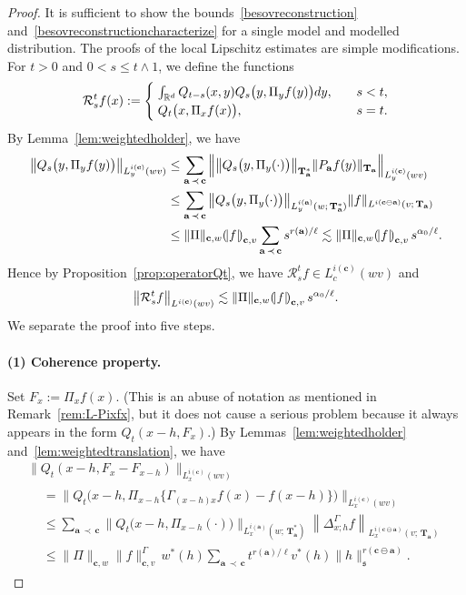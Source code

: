 \documentclass[AHL,Unicode,longabstracts,published]{cedram}
\makeatletter
\newcommand{\bbR}{\mathbb{R}}
\newcommand{\mfs}{\mathfrak{s}}
\newcommand{\wco}{w^*}
\newcommand{\vco}{v^*}
\newcommand{\bfa}{\mathbf{a}}
\newcommand{\bfc}{\mathbf{c}}
\newcommand{\bfcoa}{\mathbf{c}\ominus\mathbf{a}}
\newcommand{\bfT}{\mathbf{T}}
\newcommand{\mcR}{\mathcal{R}}
\newcommand{\llparenthesis}{\mathopen{(\mkern -2.7mu|}}
\newcommand{\rrparenthesis}{\mathclose{|\mkern -2.7mu)}}
\newcommand{\lp}{\llparenthesis}
\newcommand{\rp}{\rrparenthesis}
\newenvironment{alcases}{\left\{\begingroup\arraycolsep=0pt\renewcommand{\arraystretch}{1.2}\begin{array}{r@{\;}l@{\quad}l}}{\end{array}\endgroup\right.}
\makeatother
\begin{document}
\begin{proof}
It is sufficient to show the bounds~\eqref{besovreconstruction} and~\eqref{besovreconstructioncharacterize} for a single model and modelled distribution. The proofs of the local Lipschitz estimates are simple modifications. For $t>0$ and $0<s\le t\wedge1$, we define the functions
\begin{align*}
\mcR_s^t f(x):=
\begin{alcases}
&\int_{\bbR^d}Q_{t-s}(x,y)Q_s\big(y,\Pi_yf(y)\big)dy,\quad&s<t,\\
&Q_t\big(x,\Pi_xf(x)\big),&s=t.
\end{alcases}
\end{align*}
By Lemma~\ref{lem:weightedholder}, we have
\begin{align*}
\big\|Q_s\big(y,\Pi_yf(y)\big)\big\|_{L_y^{i(\bfc)}(wv)} &\le\sum_{\bfa\,\prec \,\bfc}\Big\|\big\|Q_s\big(y,\Pi_y(\cdot)\big)\big\|_{\bfT_\bfa^*}\|P_\bfa f(y)\|_{\bfT_\bfa}\Big\|_{L_y^{i(\bfc)}(wv)}\\
&\le\sum_{\bfa\,\prec \,\bfc}\big\|Q_s\big(y,\Pi_y(\cdot)\big)\big\|_{L_y^{i(\bfa)}(w;\,\bfT_\bfa^*)}\|f\|_{L^{i(\bfcoa)}(v;\,\bfT_\bfa)}\\
&\le \|\Pi\|_{\bfc,w}\lp f\rp_{\bfc,v}\sum_{\bfa\,\prec \,\bfc}s^{r(\bfa)/\ell}
\lesssim\|\Pi\|_{\bfc,w}\lp f\rp_{\bfc,v}\, s^{\alpha_0/\ell}.
\end{align*}
Hence by Proposition~\ref{prop:operatorQt}, we have $\mcR_s^tf\in L_c^{i(\bfc)}(wv)$ and
\[
\left\|\mcR_s^tf\right\|_{L^{i(\bfc)}(wv)}\lesssim\|\Pi\|_{\bfc,w}\lp f\rp_{\bfc,v}\, s^{\alpha_0/\ell}.
\]
We separate the proof into five steps.


\paragraph*{(1) Coherence property.}
Set $F_x:=\Pi_xf(x)$. (This is an abuse of notation as mentioned in Remark~\ref{rem:L-Pixfx}, but it does not cause a serious problem because it always appears in the form $Q_t(x-h,F_x)$.) By Lemmas~\ref{lem:weightedholder} and~\ref{lem:weightedtranslation}, we have
\begin{multline*}
\big\|Q_t(x-h,F_x-F_{x-h})\big\|_{L_x^{i(\bfc)}(wv)}
\\
\begin{aligned}
&=\big\|Q_t\big(x-h,\Pi_{x-h}\big\{\Gamma_{(x-h)x}f(x)-f(x-h)\big\}\big)\big\|_{L_x^{i(\bfc)}(wv)}\\
&\le\sum_{\bfa\,\prec \,\bfc}\big\|Q_t\big(x-h,\Pi_{x-h}(\cdot)\big)\big\|_{L_x^{i(\bfa)}\left(w;\,\bfT_\bfa^*\right)}\left\|\Delta_{x;h}^\Gamma f\right\|_{L_x^{i(\bfcoa)}(v;\,\bfT_\bfa)}
\\
&\le \|\Pi\|_{\bfc,w}\|f\|_{\bfc,v}^\Gamma\,\wco(h)\sum_{\bfa\,\prec \,\bfc}t^{r(\bfa)/\ell}\vco(h)\|h\|_{\mfs}^{r(\bfcoa)}.
\end{aligned}
\end{multline*}


\end{proof}
\end{document}
